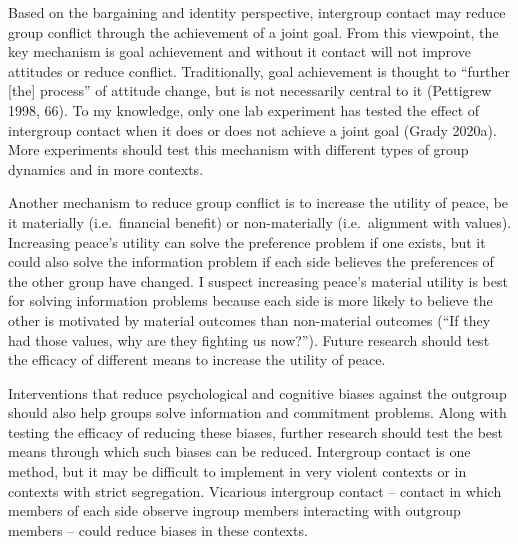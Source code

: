 \documentclass[11pt]{article}
\begin{document}
Based on the bargaining and identity perspective, intergroup contact may
reduce group conflict through the achievement of a joint goal. From this
viewpoint, the key mechanism is goal achievement and without it contact
will not improve attitudes or reduce conflict. Traditionally, goal
achievement is thought to ``further {[}the{]} process'' of attitude
change, but is not necessarily central to it (Pettigrew 1998, 66). To my
knowledge, only one lab experiment has tested the effect of intergroup
contact when it does or does not achieve a joint goal (Grady 2020a).
More experiments should test this mechanism with different types of
group dynamics and in more contexts.

Another mechanism to reduce group conflict is to increase the utility of
peace, be it materially (i.e.~financial benefit) or non-materially
(i.e.~alignment with values). Increasing peace's utility can solve the
preference problem if one exists, but it could also solve the
information problem if each side believes the preferences of the other
group have changed. I suspect increasing peace's material utility is
best for solving information problems because each side is more likely
to believe the other is motivated by material outcomes than non-material
outcomes (``If they had those values, why are they fighting us now?'').
Future research should test the efficacy of different means to increase
the utility of peace.

Interventions that reduce psychological and cognitive biases against the
outgroup should also help groups solve information and commitment
problems. Along with testing the efficacy of reducing these biases,
further research should test the best means through which such biases
can be reduced. Intergroup contact is one method, but it may be
difficult to implement in very violent contexts or in contexts with
strict segregation. Vicarious intergroup contact -- contact in which
members of each side observe ingroup members interacting with outgroup
members -- could reduce biases in these contexts.
\end{document}
